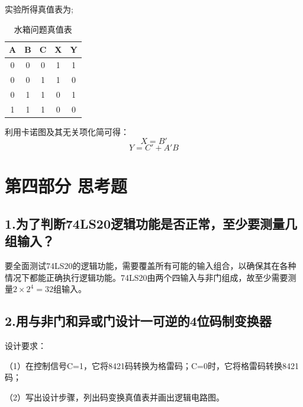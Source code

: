 \documentclass{ctexart}
\begin{document}
    实验所得真值表为;
    \begin{table}[!ht]
    \centering
    \caption{水箱问题真值表}
    \begin{tabular}{|c|c|c|c|c|}
    \hline
        A & B & C & X & Y \\ \hline
        0 & 0 & 0 & 1 & 1 \\ \hline
        0 & 0 & 1 & 1 & 0 \\ \hline
        0 & 1 & 1 & 0 & 1 \\ \hline
        1 & 1 & 1 & 0 & 0 \\ \hline
    \end{tabular}
    \end{table}

    利用卡诺图及其无关项化简可得：
    \begin{equation*}
        X=B'
    \end{equation*}
    \begin{equation*}
        Y=C'+A'B
    \end{equation*}
    \newpage
    \section*{第四部分 \quad 思考题}
    \subsection*{1.为了判断74LS20逻辑功能是否正常，至少要测量几组输入？}
    要全面测试74LS20的逻辑功能，需要覆盖所有可能的输入组合，以确保其在各种情况下都能正确执行逻辑功能。74LS20由两个四输入与非门组成，故至少需要测量$2\times2^4=32$组输入。

    \subsection*{2.用与非门和异或门设计一可逆的4位码制变换器}
    设计要求：

    （1）在控制信号C=1，它将8421码转换为格雷码；C=0时，它将格雷码转换8421码；

    （2）写出设计步骤，列出码变换真值表并画出逻辑电路图。
\end{document}
